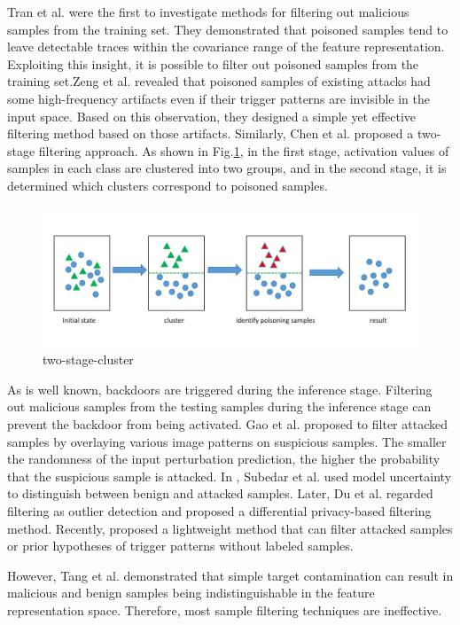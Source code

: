 \documentclass[conference]{IEEEtran}
\begin{document}
Tran et al.\cite{b67} were the first to investigate methods for filtering out malicious
samples from the training set. They demonstrated that poisoned samples tend to
leave detectable traces within the covariance range of the feature representation.
Exploiting this insight, it is possible to filter out poisoned samples from
the training set.Zeng et al. \cite{b68} revealed that poisoned samples of
existing attacks had some high-frequency artifacts even if their trigger
patterns are invisible in the input space. Based on this observation,
they designed a simple yet effective filtering method based on those artifacts.
Similarly, Chen et al. \cite{b69}proposed a two-stage filtering approach.
As shown in Fig.\ref{fig9}, in the first stage, activation values of samples in each class are clustered
into two groups, and in the second stage, it is determined which clusters
correspond to poisoned samples.


\begin{figure}[htbp]
    \centerline{\includegraphics[width=0.8\linewidth,height=0.3\linewidth]{picture/two-stage-cluster.png}}
    \caption{two-stage-cluster}
    \label{fig9}
\end{figure}


As is well known, backdoors are triggered during the inference stage.
Filtering out malicious samples from the testing samples during the inference stage can prevent the backdoor
from being activated. Gao et al. \cite{b71} proposed to filter attacked samples by overlaying various image patterns
on suspicious samples. The smaller the randomness of the input perturbation prediction, the higher the probability
that the suspicious sample is attacked. In \cite{b72}, Subedar et al. used model uncertainty to distinguish between
benign and attacked samples. Later, Du et al. \cite{b73} regarded filtering as outlier detection and proposed a
differential privacy-based filtering method. Recently, \cite{b74} proposed a lightweight method that can filter
attacked samples or prior hypotheses of trigger patterns without labeled samples.

However, Tang et al.\cite{b70} demonstrated that
simple target contamination can result in malicious and benign samples being
indistinguishable in the feature representation space. Therefore, most
sample filtering techniques are ineffective.
\end{document}
